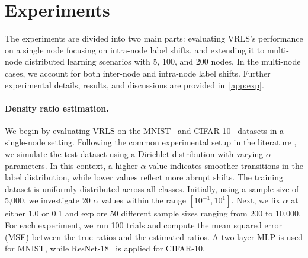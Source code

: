 \section{Experiments}\label{sec:experiment}

The experiments are divided into two main parts: evaluating VRLS's performance on a single node focusing on intra-node label shifts, and extending it to multi-node distributed learning scenarios with 5, 100, and 200 nodes. In the multi-node cases, we account for both inter-node and intra-node label shifts. Further experimental details, results, and discussions are provided in~\cref{app:exp}.

\paragraph{Density ratio estimation.}  

We begin by evaluating VRLS on the MNIST~\citep{MNIST} and CIFAR-10~\citep{CIFAR10} datasets in a single-node setting. Following the common experimental setup in the literature  \citep{bbse}, we simulate the test dataset using a Dirichlet distribution with varying $\alpha$ parameters. In this context, a higher $\alpha$ value indicates smoother transitions in the label distribution, while lower values reflect more abrupt shifts. The training dataset is uniformly distributed across all classes.
Initially, using a sample size of 5,000, we investigate 20 $\alpha$ values within the range $[10^{-1}, 10^{1}]$. Next, we fix $\alpha$ at either 1.0 or 0.1 and explore 50 different sample sizes ranging from 200 to 10,000. For each experiment, we run 100 trials and compute the mean squared error (MSE) between the true ratios and the estimated ratios.
A two-layer MLP is used for MNIST, while ResNet-18~\citep{he2016deep} is applied for CIFAR-10.

